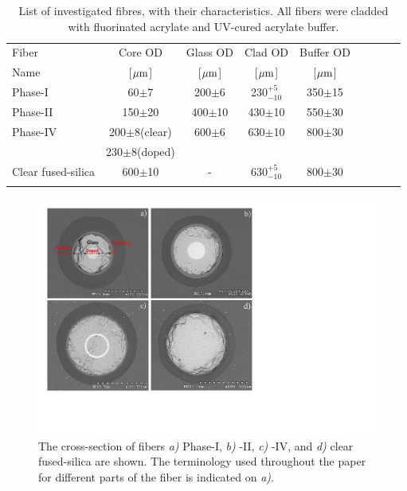 \documentclass[a4paper,11pt]{article}
\begin{document}
\begin{table}[htp]
\caption{\small List of investigated fibres, with their characteristics. All fibers were cladded with fluorinated acrylate and UV-cured acrylate buffer.}
\vspace{-2 mm}
\begin{center}
{\small
\begin{tabular}{|l|c|c|c|c|c|c|c|c|} \hline
Fiber              &  Core OD            & Glass OD        & Clad OD          & Buffer  OD        \\
Name               &[${\rm \mu m}$]      & [${\rm \mu m}$] & [${\rm \mu m}$]  & [${\rm \mu m}$]   \\
\hline
Phase-I            & 60$\pm$7            &	200$\pm$6      & 230$^{+5}_{-10}$ &	350$\pm$15        \\
Phase-II           & 150$\pm$20		     &	400$\pm$10     & 430$\pm$10	      &	550$\pm$30        \\
Phase-IV           & 200$\pm$8(clear)   &	600$\pm$6	   & 630$\pm$10       &	800$\pm$30        \\
                          & 230$\pm$8(doped) &	   &     &	         \\
Clear fused-silica & 600$\pm$10          &-				   & 630$^{+5}_{-10}$ &	800$\pm$30	      \\
                    &                     &                &                  & \\
\hline
\end{tabular}
}
\end{center}
\label{tab:fiberlist}
\end{table}


\begin{figure}[ht]
\begin{center}\vspace{-1pc}
      \includegraphics[width=10 cm]{Figures/allfiberimage2.pdf}
\caption{\small The cross-section of fibers
{\it a)} Phase-I,
{\it b)} -II,
{\it c)} -IV, and
{\it d)} clear fused-silica are shown.  The terminology used throughout the paper for different parts of the fiber is indicated on {\it a)}.}
    \label{fig:FiberCrossSections}
\end{center}
\end{figure}
\end{document}
